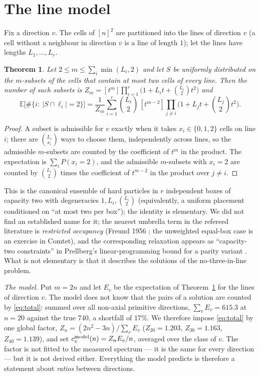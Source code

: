 \documentclass[11pt,a4paper]{article}
\newtheorem{theorem}{Theorem}
\begin{document}
\section{The line model}
Fix a direction $v$.  The cells of $[n]^2$ are partitioned into the lines of direction $v$ (a cell without a
neighbour in direction $v$ is a line of length $1$); let the lines have lengths $L_1,\dots,L_r$.

\begin{theorem}\label{thm:gf}
Let $2\le m\le\sum_i\min(L_i,2)$ and let $S$ be uniformly distributed on the $m$-subsets of the cells that contain at
most two cells of every line.  Then the number of such subsets is $Z_m=[t^m]\prod_{i=1}^{r}\bigl(1+L_it+\binom{L_i}{2}t^2\bigr)$
and
\[\mathbb{E}\bigl[\#\{i:\ |S\cap\ell_i|=2\}\bigr]=\frac{1}{Z_m}\sum_{i=1}^{r}\binom{L_i}{2}\,[t^{m-2}]\prod_{j\ne i}\bigl(1+L_jt+\binom{L_j}{2}t^2\bigr).\]
\end{theorem}
\begin{proof}
A subset is admissible for $v$ exactly when it takes $x_i\in\{0,1,2\}$ cells on line $i$; there are $\binom{L_i}{x_i}$
ways to choose them, independently across lines, so the admissible $m$-subsets are counted by the coefficient of $t^m$
in the product.  The expectation is $\sum_iP(x_i=2)$, and the admissible $m$-subsets with $x_i=2$ are counted by
$\binom{L_i}{2}$ times the coefficient of $t^{m-2}$ in the product over $j\ne i$.
\end{proof}

This is the canonical ensemble of hard particles in $r$ independent boxes of capacity two with degeneracies
$1,L_i,\binom{L_i}{2}$ (equivalently, a uniform placement conditioned on ``at most two per box''); the identity is
elementary.  We did not find an established name for it; the nearest umbrella term in the refereed literature is
\emph{restricted occupancy} (Freund 1956 \cite{Freund}; the unweighted equal-box case is an exercise in Comtet),
and the corresponding relaxation appears as ``capacity-two constraints'' in Prellberg's linear-programming bound for a
parity variant \cite{PrellbergCB}.  What is not elementary is that it describes the solutions of the no-three-in-line problem.

\emph{The model.}  Put $m=2n$ and let $E_v$ be the expectation of Theorem~\ref{thm:gf} for the lines of direction $v$.
The model does not know that the pairs of a solution are counted by \eqref{eq:total}: summed over all non-axial
primitive directions, $\sum_vE_v=615.3$ at $n=20$ against the true $740$, a shortfall of $17\%$.  We therefore
impose \eqref{eq:total} by one global factor, $Z_n=(2n^2-3n)/\sum_vE_v$ ($Z_{20}=1.203$, $Z_{30}=1.163$,
$Z_{40}=1.139$), and set $c^{\rm model}_v(n)=Z_nE_v/n$, averaged over the class of $v$.  The factor is not fitted to
the measured spectrum --- it is the same for every direction --- but it is not derived either.  Everything the model
predicts is therefore a statement about \emph{ratios} between directions.
\end{document}
